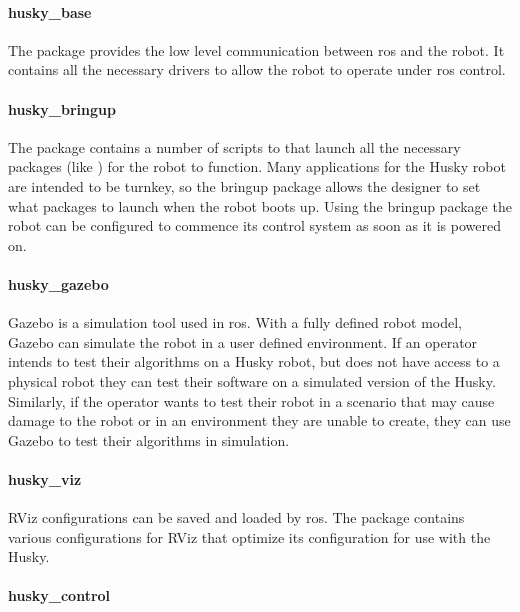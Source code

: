 \paragraph{husky\_base}

The  package provides the low level communication between \acrshort{ros} and the robot. It contains all the necessary drivers to allow the robot to operate under \acrshort{ros} control.\\

\paragraph{husky\_bringup}

The  package contains a number of scripts to that launch all the necessary packages (like ) for the robot to function. Many applications for the Husky robot are intended to be turnkey, so the bringup package allows the designer to set what packages to launch when the robot boots up. Using the bringup package the robot can be configured to commence its control system as soon as it is powered on.\\

\paragraph{husky\_gazebo}

Gazebo is a simulation tool used in \acrshort{ros}. With a fully defined robot model, Gazebo can simulate the robot in a user defined environment. If an operator intends to test their algorithms on a Husky robot, but does not have access to a physical robot they can test their software on a simulated version of the Husky. Similarly, if the operator wants to test their robot in a scenario that may cause damage to the robot or in an environment they are unable to create, they can use Gazebo to test their algorithms in simulation.\\

\paragraph{husky\_viz}

RViz configurations can be saved and loaded by \acrshort{ros}. The  package contains various configurations for RViz that optimize its configuration for use with the Husky.\\

\paragraph{husky\_control}

